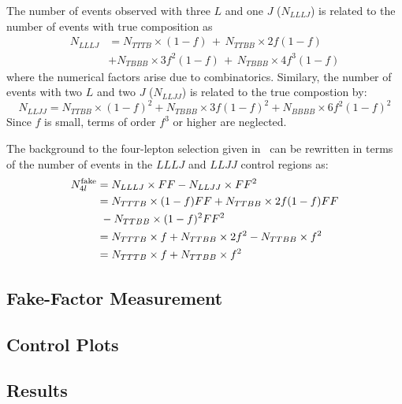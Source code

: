 The number of events observed with three $L$ and one $J$ ($N_{LLLJ}$) is related to
the number of events with true composition as
\begin{align}
N_{LLLJ} &= N_{TTTB} \times (1-f)\, +\, N_{TTBB} \times 2f(1-f) \\
         &+ N_{TBBB} \times 3f^{2}(1-f)\, +\,  N_{TBBB} \times 4f^{3}(1-f) 
\end{align}
where the numerical factors arise due to combinatorics. Similary, the number of events with two $L$ and two $J$ ($N_{LLJJ}$) is related to the
true compostion by:
\begin{equation}
N_{LLJJ} = N_{TTBB} \times (1-f)^{2} + N_{TBBB} \times 3 f(1-f)^{2}  + N_{BBBB}
\times 6 f^{2}(1-f)^{2}
\end{equation}
Since $f$ is small,
terms of order $f^{3}$ or higher are neglected.

The background to the four-lepton selection given in~ can 
be rewritten in terms of the number of events in the $LLLJ$ and $LLJJ$ control
regions as:
\begin{align}
N_{4l}^{\rm fake} &= N_{LLLJ} \times FF - N_{LLJJ} \times FF^{2} \\
 &= N_{TTTB} \times (1-f) FF + N_{TTBB} \times 2f (1 - f) FF \\
 &\ - N_{TTBB} \times (1-f)^{2} FF^{2} \\
 &=  N_{TTTB} \times f + N_{TTBB} \times 2 f^{2} - N_{TTBB} \times f^{2} \\
 &= N_{TTTB} \times f + N_{TTBB} \times f^{2} \\
\end{align}

\subsection{Fake-Factor Measurement}
\subsection{Control Plots}
\subsection{Results}
